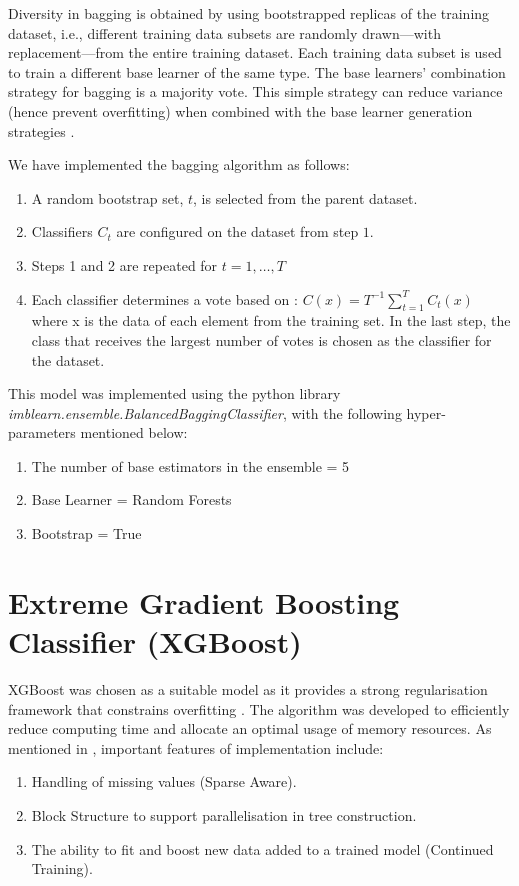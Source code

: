 Diversity in bagging is obtained by using bootstrapped replicas of the training dataset, i.e., different training data subsets are randomly drawn—with replacement—from the entire training dataset. Each training data subset is used to train a different base learner of the same type. The base learners’ combination strategy for bagging is a majority vote. This simple strategy can reduce variance (hence prevent overfitting) when combined with the base learner generation strategies \cite{figini2016corporate}. 


We have implemented the bagging algorithm as follows:

\begin{enumerate}
    \item A random bootstrap set, $t$, is selected from the parent dataset.
    \item Classifiers $C_{t}$ are configured on the dataset from step $1 .$
    \item Steps 1 and 2 are repeated for $t=1, \ldots, T$
    \item Each classifier determines a vote based on : 
$C(x)=T^{-1} \sum_{t=1}^{T} C_{t}(x)$
\\where x is the data of each element from the training set. In the last step, the class that receives the largest number of votes is chosen as the classifier for the dataset.
\end{enumerate}


This model was implemented using the python library \textit{imblearn.ensemble.BalancedBaggingClassifier}, with the following hyper-parameters mentioned below:

\begin{enumerate}
    \item The number of base estimators in the ensemble = 5
    \item Base Learner = Random Forests
    \item Bootstrap = True
\end{enumerate}


\section{Extreme Gradient Boosting Classifier (XGBoost)}
XGBoost was chosen as a suitable model as it provides a strong regularisation framework that constrains overfitting \cite{sewell2008ensemble}. The algorithm was developed to efficiently reduce computing time and allocate an optimal usage of memory resources. As mentioned in \cite{chen2016xgboost}, important features of implementation include:
\begin{enumerate}
    \item Handling of missing values (Sparse Aware).
    \item Block Structure to support parallelisation in tree construction.
    \item The ability to fit and boost new data added to a trained model (Continued Training).
    
\end{enumerate}

